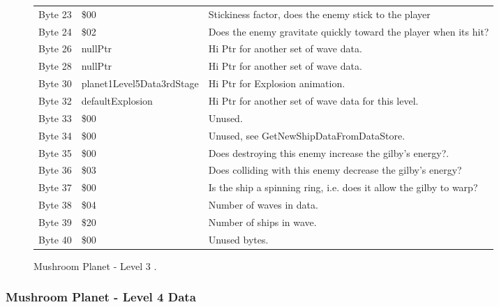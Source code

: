 \begin{figure}[H]
{\begin{adjustbox}{width=12cm}
\begin{tabular}{lll}
 Byte 23 & \$00                       & Stickiness factor, does the enemy stick to the player              \\
 Byte 24 & \$02                       & Does the enemy gravitate quickly toward the player when its hit?   \\
 Byte 26 & nullPtr                   & Hi Ptr for another set of wave data.                               \\
 Byte 28 & nullPtr                   & Hi Ptr for another set of wave data.                               \\
 Byte 30 & planet1Level5Data3rdStage & Hi Ptr for Explosion animation.                                    \\
 Byte 32 & defaultExplosion          & Hi Ptr for another set of wave data for this level.                \\
 Byte 33 & \$00                       & Unused.                                                            \\
 Byte 34 & \$00                       & Unused, see GetNewShipDataFromDataStore.                           \\
 Byte 35 & \$00                       & Does destroying this enemy increase the gilby's energy?.           \\
 Byte 36 & \$03                       & Does colliding with this enemy decrease the gilby's energy?        \\
 Byte 37 & \$00                       & Is the ship a spinning ring, i.e. does it allow the gilby to warp? \\
 Byte 38 & \$04                       & Number of waves in data.                                           \\
 Byte 39 & \$20                       & Number of ships in wave.                                           \\
 Byte 40 & \$00                       & Unused bytes.                                                      \\
\bottomrule
\end{tabular}

  \end{adjustbox}

  }\caption*{Mushroom Planet - Level 3
.}
\end{figure}

\clearpage
\subsubsection{Mushroom Planet - Level 4 Data}

